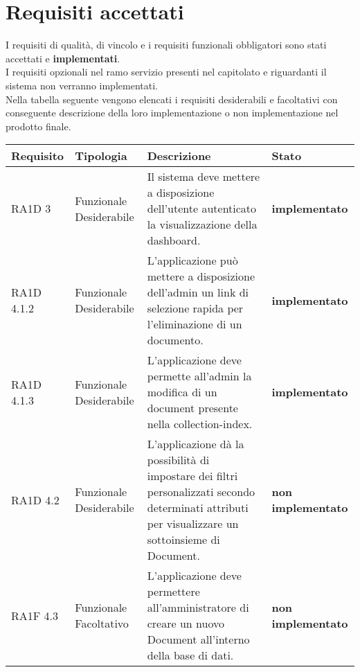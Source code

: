 \section{Requisiti accettati }
I requisiti di qualità, di vincolo e i requisiti funzionali obbligatori sono stati accettati e \textbf{{\color{green} implementati}}. \\
I requisiti opzionali nel ramo servizio presenti nel capitolato e riguardanti il sistema  non verranno implementati. \\
Nella tabella seguente vengono elencati i requisiti desiderabili e facoltativi con conseguente descrizione della loro implementazione o non implementazione nel prodotto finale.

      \bgroup
      \def\arraystretch{1.8}
      \begin{longtable}{ | l | p{2cm} | p{5cm} | p{4cm}| }
    
      \cellcolor[gray]{0.9} \textbf{Requisito} & \cellcolor[gray]{0.9} \textbf{Tipologia} 
      & \cellcolor[gray]{0.9} \textbf{Descrizione}  & \cellcolor[gray]{0.9} \textbf{Stato} \\ \hline
      
        
        RA1D 3 & Funzionale \newline  Desiderabile  & Il sistema deve mettere a disposizione dell'utente autenticato la visualizzazione della dashboard. & \textbf{{\color{green}implementato}} \newline \\ \hline      
            
        RA1D 4.1.2 & Funzionale \newline  Desiderabile  & L’applicazione può mettere a disposizione dell’admin un link di selezione rapida per l’eliminazione di un documento. \newline & \textbf{{\color{green} implementato}} \newline \\ \hline      
        RA1D 4.1.3 & Funzionale \newline  Desiderabile  & L’applicazione deve permette all’admin la modifica di un document presente nella collection-index. & \textbf{{\color{green} implementato}} \newline\\ \hline      
        RA1D 4.2 & Funzionale \newline  Desiderabile  & L’applicazione dà la possibilità di impostare dei filtri personalizzati secondo determinati attributi per visualizzare un sottoinsieme di Document.  & \textbf{{\color{red}non implementato}} \newline \\ \hline      
        RA1F 4.3 & Funzionale \newline  Facoltativo  & L’applicazione deve permettere all’amministratore di creare un nuovo Document all’interno della base di dati. & \textbf{{\color{red} non implementato}} \newline \\ \hline      
        

\end{longtable}
